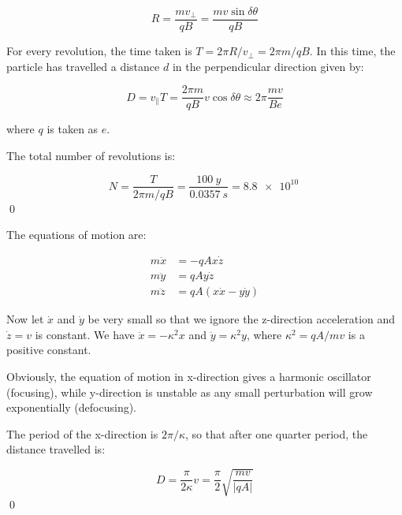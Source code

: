 \documentclass[12pt]{article}
\begin{document}
\begin{equation}
    R = \frac{mv_{\perp}}{qB} = \frac{mv \sin{\delta \theta}}{qB}
\end{equation}

For every revolution, the time taken is $T = 2\pi R/v_{\perp} = 2\pi m/qB$. In this time, the particle has travelled a distance $d$ in the perpendicular direction given by:

\begin{equation}
    D = v_{\parallel} T = \frac{2\pi m}{qB} v \cos{\delta \theta} \approx 2\pi \frac{mv}{Be}
\end{equation}

where $q$ is taken as $e$.

The total number of revolutions is:

\begin{equation}
    N = \frac{T}{2\pi m/qB} = \frac{\qty{100}{y}}{\qty{0.0357}{s}} = \qty{8.8e10}{}
\end{equation}
\qed



The equations of motion are:

\begin{equation}
\begin{split}
    m \ddot{x} &= -qAx \dot{z} \\
    m \ddot{y} &= qAy \dot{z} \\
    m \ddot{z} &= qA(x\dot{x} - y\dot{y})
\end{split}
\end{equation}

Now let $\dot{x}$ and $\dot{y}$ be very small so that we ignore the z-direction acceleration and $\dot{z} = v$ is constant. We have $\ddot{x} = -\kappa^{2} x$ and $\ddot{y} = \kappa^{2} y$, where $\kappa^{2} = qA/mv$ is a positive constant.

Obviously, the equation of motion in x-direction gives a harmonic oscillator (focusing), while y-direction is unstable as any small perturbation will grow exponentially (defocusing). 

The period of the x-direction is $2\pi/\kappa$, so that after one quarter period, the distance travelled is:

\begin{equation}
    D = \frac{\pi}{2\kappa} v = \frac{\pi}{2} \sqrt{\frac{mv}{\left\lvert qA \right\rvert}}
\end{equation}
\qed
\end{document}
